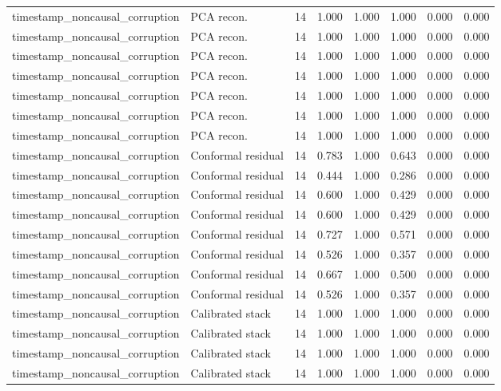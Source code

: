 {\begin{longtable}{llrrrrrr}
timestamp\_noncausal\_corruption & PCA recon. & 14 & 1.000 & 1.000 & 1.000 & 0.000 & 0.000 \\
timestamp\_noncausal\_corruption & PCA recon. & 14 & 1.000 & 1.000 & 1.000 & 0.000 & 0.000 \\
timestamp\_noncausal\_corruption & PCA recon. & 14 & 1.000 & 1.000 & 1.000 & 0.000 & 0.000 \\
timestamp\_noncausal\_corruption & PCA recon. & 14 & 1.000 & 1.000 & 1.000 & 0.000 & 0.000 \\
timestamp\_noncausal\_corruption & PCA recon. & 14 & 1.000 & 1.000 & 1.000 & 0.000 & 0.000 \\
timestamp\_noncausal\_corruption & PCA recon. & 14 & 1.000 & 1.000 & 1.000 & 0.000 & 0.000 \\
timestamp\_noncausal\_corruption & PCA recon. & 14 & 1.000 & 1.000 & 1.000 & 0.000 & 0.000 \\
timestamp\_noncausal\_corruption & Conformal residual & 14 & 0.783 & 1.000 & 0.643 & 0.000 & 0.000 \\
timestamp\_noncausal\_corruption & Conformal residual & 14 & 0.444 & 1.000 & 0.286 & 0.000 & 0.000 \\
timestamp\_noncausal\_corruption & Conformal residual & 14 & 0.600 & 1.000 & 0.429 & 0.000 & 0.000 \\
timestamp\_noncausal\_corruption & Conformal residual & 14 & 0.600 & 1.000 & 0.429 & 0.000 & 0.000 \\
timestamp\_noncausal\_corruption & Conformal residual & 14 & 0.727 & 1.000 & 0.571 & 0.000 & 0.000 \\
timestamp\_noncausal\_corruption & Conformal residual & 14 & 0.526 & 1.000 & 0.357 & 0.000 & 0.000 \\
timestamp\_noncausal\_corruption & Conformal residual & 14 & 0.667 & 1.000 & 0.500 & 0.000 & 0.000 \\
timestamp\_noncausal\_corruption & Conformal residual & 14 & 0.526 & 1.000 & 0.357 & 0.000 & 0.000 \\
timestamp\_noncausal\_corruption & Calibrated stack & 14 & 1.000 & 1.000 & 1.000 & 0.000 & 0.000 \\
timestamp\_noncausal\_corruption & Calibrated stack & 14 & 1.000 & 1.000 & 1.000 & 0.000 & 0.000 \\
timestamp\_noncausal\_corruption & Calibrated stack & 14 & 1.000 & 1.000 & 1.000 & 0.000 & 0.000 \\
timestamp\_noncausal\_corruption & Calibrated stack & 14 & 1.000 & 1.000 & 1.000 & 0.000 & 0.000 \\

\end{longtable}}
